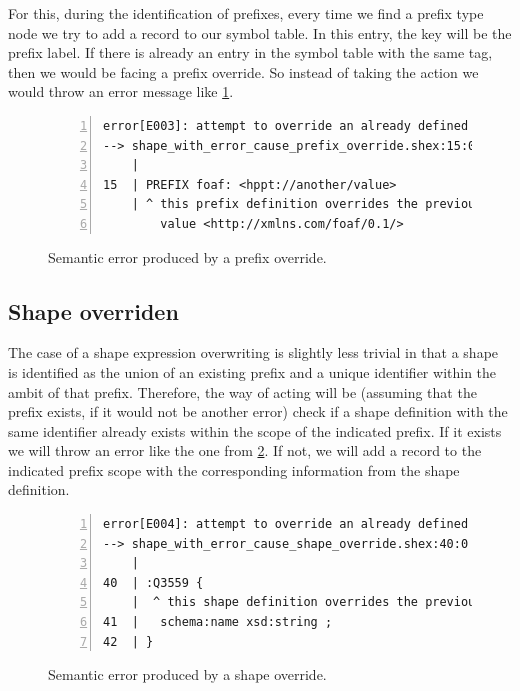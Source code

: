 For this, during the identification of prefixes, every time we find a prefix type node we try to add a record
to our symbol table. In this entry, the key will be the prefix label. If there is already an entry in the symbol
table with the same tag, then we would be facing a prefix override. So instead of taking the action we would
throw an error message like \cref{fig:err-override-prefix}.

\begin{figure}
    \begin{lstlisting}[numbers=left,basicstyle=\ttfamily\scriptsize]
error[E003]: attempt to override an already defined prefix
--> shape_with_error_cause_prefix_override.shex:15:0
    |
15  | PREFIX foaf: <hppt://another/value>
    | ^ this prefix definition overrides the previous one (9:0) with
        value <http://xmlns.com/foaf/0.1/>
    \end{lstlisting}
    \caption[Semantic error produced by a prefix override]{Semantic error produced by a prefix override.}
    \label{fig:err-override-prefix}
\end{figure}

\subsection{Shape overriden}
The case of a shape expression overwriting is slightly less trivial in that a shape is identified as the
union of an existing prefix and a unique identifier within the ambit of that prefix. Therefore, the way
of acting will be (assuming that the prefix exists, if it would not be another error) check if a shape
definition with the same identifier already exists within the scope of the indicated prefix. If it exists
we will throw an error like the one from \cref{fig:err-override-shape}. If not, we will add a record to the
indicated prefix scope with the corresponding information from the shape definition.

\begin{figure}
    \begin{lstlisting}[numbers=left,basicstyle=\ttfamily\scriptsize]
error[E004]: attempt to override an already defined shape
--> shape_with_error_cause_shape_override.shex:40:0
    |
40  | :Q3559 {
    |  ^ this shape definition overrides the previous one (17:0)
41  |   schema:name xsd:string ;
42  | }
    \end{lstlisting}
    \caption[Semantic error produced by a shape override]{Semantic error produced by a shape override.}
    \label{fig:err-override-shape}
\end{figure}

